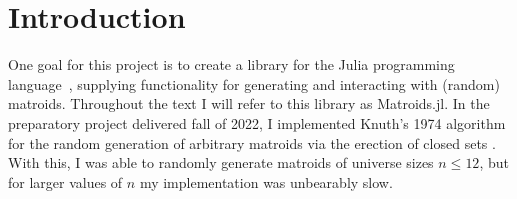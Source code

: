 \chapter{Introduction}

One goal for this project is to create a library for the Julia programming language~\cite{bezanson2017julia}, supplying functionality for generating and interacting with (random) matroids. Throughout the text I will refer to this library as Matroids.jl. In the preparatory project delivered fall of 2022, I implemented Knuth's 1974 algorithm for the random generation of arbitrary matroids via the erection of closed sets \cite{knuth-1975}. With this, I was able to randomly generate matroids of universe sizes $n \leq 12$, but for larger values of $n$ my implementation was unbearably slow. 

\skelpars[1]